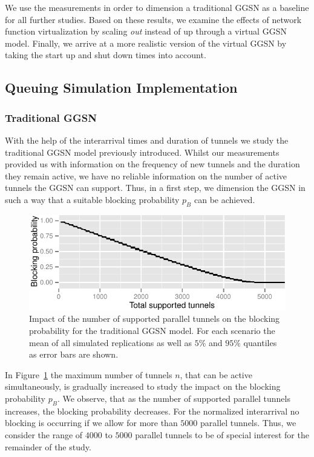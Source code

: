 We use the measurements in order to dimension a traditional \gls{GGSN} as a baseline for all further studies. Based on these results, we examine the effects of network function virtualization by scaling \emph{out} instead of up through a virtual \gls{GGSN} model. Finally, we arrive at a more realistic version of the virtual \gls{GGSN} by taking the start up and shut down times into account.


\subsection{Queuing Simulation Implementation}


\subsubsection{Traditional GGSN}
\label{c4:sec:eval_traditional_ggsn}

With the help of the interarrival times and duration of tunnels we study the traditional \gls{GGSN} model previously introduced. Whilst our measurements provided us with information on the frequency of new tunnels and the duration they remain active, we have no reliable information on the number of active tunnels the \gls{GGSN} can support. Thus, in a first step, we dimension the \gls{GGSN} in such a way that a suitable blocking probability $p_B$ can be achieved.

\begin{figure}[htpb]
  \centering
    \includegraphics[width=1.0\textwidth]{images/traditional-blocking.pdf}
  \caption{Impact of the number of supported parallel tunnels on the blocking probability for the traditional \gls{GGSN} model. For each scenario the mean of all simulated replications as well as $5\%$ and $95\%$ quantiles as error bars are shown.}
  \label{c4:fig:traditional_blocking}
\end{figure}

In Figure~\ref{c4:fig:traditional_blocking} the maximum number of tunnels $n$, that can be active simultaneously, is gradually increased to study the impact on the blocking probability $p_B$. We observe, that as the number of supported parallel tunnels increases, the blocking probability decreases. For the normalized interarrival no blocking is occurring if we allow for more than $5000$ parallel tunnels. Thus, we consider the range of $4000$ to $5000$ parallel tunnels to be of special interest for the remainder of the study.



